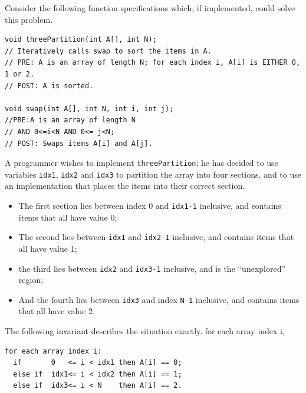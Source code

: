 \documentclass[twoside=false,DIV=14]{scrartcl}
\begin{document}
Consider the following function specifications which, if implemented, could solve this problem.
{\small\begin{lstlisting}
void threePartition(int A[], int N);
// Iteratively calls swap to sort the items in A.
// PRE: A is an array of length N; for each index i, A[i] is EITHER 0, 1 or 2.
// POST: A is sorted.

void swap(int A[], int N, int i, int j); 
//PRE:A is an array of length N
// AND 0<=i<N AND 0<= j<N;
// POST: Swaps items A[i] and A[j].
\end{lstlisting}}
A programmer wishes to implement \verb+threePartition+; he has decided to use variables \verb+idx1+, \verb+idx2+ and \verb+idx3+ to partition the array into four sections, and to use an implementation that places the items into their correct section.
\begin{itemize}
\item The first section lies between index 0 and \verb+idx1-1+ inclusive, and contains items that all have value 0;
\item The second lies between \verb+idx1+ and \verb+idx2-1+ inclusive, and contains items that all have value 1;
\item the third lies between \verb+idx2+ and \verb+idx3-1+ inclusive, and is the “unexplored” region;
\item And the fourth lies between \verb+idx3+ and index \verb+N-1+ inclusive, and contains items that all have
value 2.
\end{itemize}
The following invariant describes the situation exactly.
for each array index i,
\begin{lstlisting}
for each array index i:
  if       0   <= i < idx1 then A[i] == 0; 
  else if  idx1<= i < idx2 then A[i] == 1; 
  else if  idx3<= i < N    then A[i] == 2.
\end{lstlisting}
\end{document}
